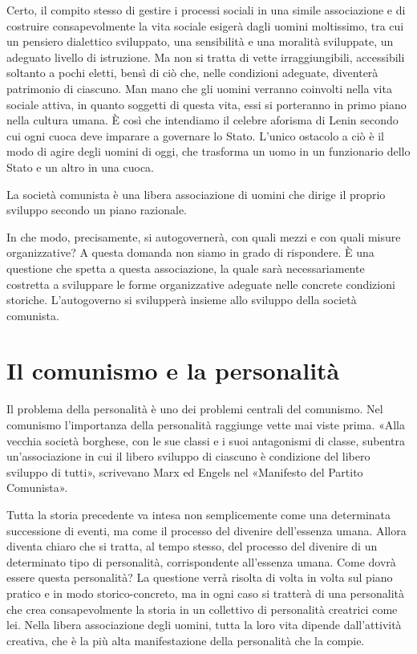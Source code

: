 \documentclass[12pt,a4paper,openany]{book}
\begin{document}
Certo, il compito stesso di gestire i processi sociali in una simile associazione e di costruire consapevolmente la vita sociale esigerà dagli uomini moltissimo, tra cui un pensiero dialettico sviluppato, una sensibilità e una moralità sviluppate, un adeguato livello di istruzione. Ma non si tratta di vette irraggiungibili, accessibili soltanto a pochi eletti, bensì di ciò che, nelle condizioni adeguate, diventerà patrimonio di ciascuno. Man mano che gli uomini verranno coinvolti nella vita sociale attiva, in quanto soggetti di questa vita, essi si porteranno in primo piano nella cultura umana. È così che intendiamo il celebre aforisma di Lenin secondo cui ogni cuoca deve imparare a governare lo Stato. L'unico ostacolo a ciò è il modo di agire degli uomini di oggi, che trasforma un uomo in un funzionario dello Stato e un altro in una cuoca.

La società comunista è una libera associazione di uomini che dirige il proprio sviluppo secondo un piano razionale.

In che modo, precisamente, si autogovernerà, con quali mezzi e con quali misure organizzative? A questa domanda non siamo in grado di rispondere. È una questione che spetta a questa associazione, la quale sarà necessariamente costretta a sviluppare le forme organizzative adeguate nelle concrete condizioni storiche. L'autogoverno si svilupperà insieme allo sviluppo della società comunista.
\ifSubfilesClassLoaded{\setcounter{page}{47}}{}
\section{Il comunismo e la personalità}
\label{sec:08_comunismo_individuo}

Il problema della personalità è uno dei problemi centrali del comunismo. Nel comunismo l'importanza della personalità raggiunge vette mai viste prima. «Alla vecchia società borghese, con le sue classi e i suoi antagonismi di classe, subentra un'associazione in cui il libero sviluppo di ciascuno è condizione del libero sviluppo di tutti», scrivevano Marx ed Engels nel «Manifesto del Partito Comunista».

Tutta la storia precedente va intesa non semplicemente come una determinata successione di eventi, ma come il processo del divenire dell'essenza umana. Allora diventa chiaro che si tratta, al tempo stesso, del processo del divenire di un determinato tipo di personalità, corrispondente all'essenza umana. Come dovrà essere questa personalità? La questione verrà risolta di volta in volta sul piano pratico e in modo storico-concreto, ma in ogni caso si tratterà di una personalità che crea consapevolmente la storia in un collettivo di personalità creatrici come lei. Nella libera associazione degli uomini, tutta la loro vita dipende dall'attività creativa, che è la più alta manifestazione della personalità che la compie.
\end{document}
